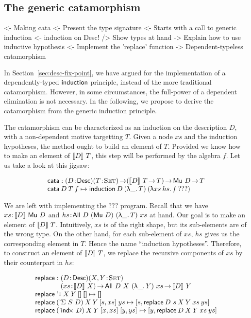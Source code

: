 \subsection{The generic catamorphism}

\begin{wstructure}
<- Making cata
    <- Present the type signature
    <- Starts with a call to generic induction
        <- induction on Desc!
        /> Show types at hand
        -> Explain how to use inductive hypothesis
    <- Implement the 'replace' function
    -> Dependent-typeless catamorphism 
\end{wstructure}

In Section~\ref{sec:desc-fix-point}, we have argued for the
implementation of a dependently-typed $\F{induction}$ principle,
instead of the more traditional catamorphism. However, in some
circumstances, the full-power of a dependent elimination is not
necessary. In the following, we propose to derive the catamorphism
from the generic induction principle. 

The catamorphism can be characterized as an induction on the
description $D$, with a non-dependent motive targetting $T$. Given a
node $xs$ and the induction hypotheses, the method ought to build an
element of $T$. Provided we know how to make an element of
$\descop{D}{T}$, this step will be performed by the algebra $f$. Let
us take a look at this jigsaw:

\newcommand{\cata}{\F{cata}}

\[\stk{
\cata : \PITEL{D}{\Desc}
           \PI{T}{\Set}
           (\descop{D}{T} \To T) \To 
           \Mu{D} \To T \\
\cata\: D\: T\: f \mapsto
  \F{induction}\: D\: (\LAM{\_}T)\: (\LAM{xs\:hs} f\: ???)
}\]

We are left with implementing the \(???\) program. Recall that we have
\(\Bhab{xs}{\descop{D}{\Mu{D}}}\) and
\(\Bhab{hs}{\All{D}{(\Mu{D})}{(\LAM{\_} T)}{xs}}\) at hand. Our goal
is to make an element of \(\descop{D}{T}\). Intuitively, $xs$ is of
the right shape, but its sub-elements are of the wrong type. On the
other hand, for each sub-element of $xs$, $hs$ gives us the
corresponding element in $T$. Hence the name ``induction
hypotheses''. Therefore, to construct an element of \(\descop{D}{T}\),
we replace the recursive components of \(xs\) by their counterpart in
\(hs\):


\[\stk{
\F{replace} : \stk{\PITEL{D}{\Desc}
                   \PITEL{X,Y}{\Set}\\
                   \PI{xs}{\descop{D}{X}} 
                   \All{D}{X}{(\LAM{\_}Y)}{xs} \To
                   \descop{D}{Y}} \\
\F{replace}\: \DUnit\:          X\: Y\: \Void\:          \Void          \mapsto \Void \\
\F{replace}\: (\DSigma{S}{D})\: X\: Y\: \pair{s}{xs}{}\: ys             \mapsto
    \pair{s}{\F{replace}\: {D~s}\: X\: Y\: xs\: ys}{}                                 \\
\F{replace}\: (\DIndx{D})\:     X\: Y\: \pair{x}{xs}{}\: \pair{y}{ys}{} \mapsto
    \pair{y}{\F{replace}\: D\: X\: Y\: xs\: ys}{}
}\]

